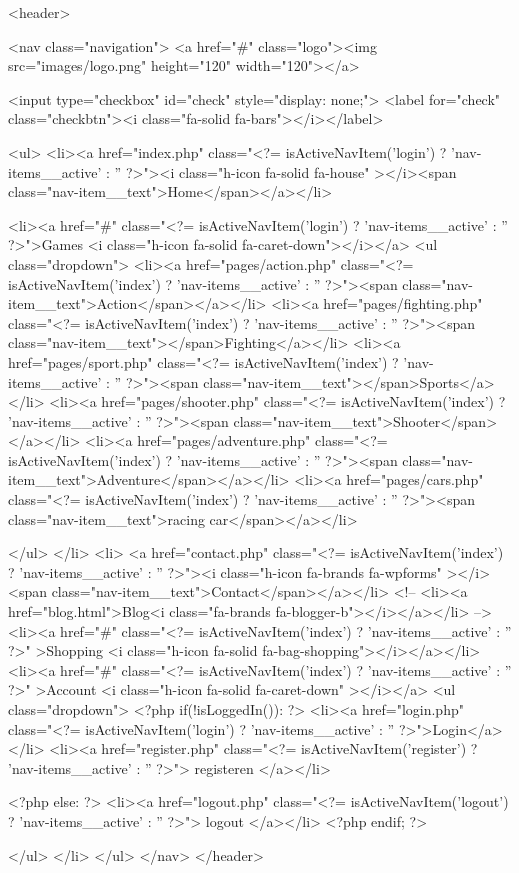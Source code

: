 
<header>


<nav class="navigation">
<a href="#" class="logo"><img src="images/logo.png" height="120" width="120"></a>

<input type="checkbox" id="check" style="display: none;">
 <label  for="check"  class="checkbtn"><i class="fa-solid fa-bars"></i></label>


    <ul>
      <li><a  href="index.php" class="<?= isActiveNavItem('login') ? 'nav-items__active' : '' ?>"><i class="h-icon fa-solid fa-house" ></i><span class="nav-item__text">Home</span></a></li>
   


      <li><a  href="#" class="<?= isActiveNavItem('login') ? 'nav-items__active' : '' ?>">Games <i class="h-icon fa-solid fa-caret-down"></i></a>
        <ul class="dropdown">
            <li><a  href="pages/action.php" class="<?= isActiveNavItem('index') ? 'nav-items__active' : '' ?>"><span class="nav-item__text">Action</span></a></li>
            <li><a  href="pages/fighting.php" class="<?= isActiveNavItem('index') ? 'nav-items__active' : '' ?>"><span class="nav-item__text"></span>Fighting</a></li>
            <li><a  href="pages/sport.php" class="<?= isActiveNavItem('index') ? 'nav-items__active' : '' ?>"><span class="nav-item__text"></span>Sports</a></li>
            <li><a  href="pages/shooter.php" class="<?= isActiveNavItem('index') ? 'nav-items__active' : '' ?>"><span class="nav-item__text">Shooter</span></a></li>
            <li><a  href="pages/adventure.php" class="<?= isActiveNavItem('index') ? 'nav-items__active' : '' ?>"><span class="nav-item__text">Adventure</span></a></li>
            <li><a  href="pages/cars.php" class="<?= isActiveNavItem('index') ? 'nav-items__active' : '' ?>"><span class="nav-item__text">racing car</span></a></li>


            
        </ul>
        </li>
          <li> <a  href="contact.php" class="<?= isActiveNavItem('index') ? 'nav-items__active' : '' ?>"><i class="h-icon fa-brands fa-wpforms" ></i><span class="nav-item__text">Contact</span></a></li>
          <!-- <li><a  href="blog.html">Blog<i class="fa-brands fa-blogger-b"></i></a></li> -->
          <li><a  href="#" class="<?= isActiveNavItem('index') ? 'nav-items__active' : '' ?>" >Shopping <i class="h-icon fa-solid fa-bag-shopping"></i></a></li>
          <li><a  href="#" class="<?= isActiveNavItem('index') ? 'nav-items__active' : '' ?>" >Account <i class="h-icon fa-solid fa-caret-down" ></i></a>
            <ul class="dropdown">
            <?php if(!isLoggedIn()): ?>
            <li><a  href="login.php" class="<?= isActiveNavItem('login') ? 'nav-items__active' : '' ?>">Login</a></li>
            <li><a  href="register.php" class="<?= isActiveNavItem('register') ? 'nav-items__active' : '' ?>"> registeren </a></li>

            <?php else: ?>
            <li><a  href="logout.php" class="<?= isActiveNavItem('logout') ? 'nav-items__active' : '' ?>"> logout </a></li>
            <?php endif; ?>

            </ul>
            </li>
            </ul>
            </nav>
</header>


